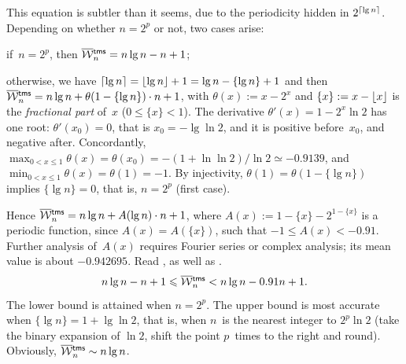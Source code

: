 This equation is subtler than it seems, due to the periodicity hidden
in \(2^{\lceil{\lg n}\rceil}\). Depending on whether \(n = 2^p\) or not,
two cases arise:
\begin{itemize*}

  \item if~\(n=2^p\), then \(\OW{\fun{tms}}{n} = n\lg n - n +
    1\);

  \item otherwise, we have \(\lceil{\lg n}\rceil = \lfloor{\lg n}\rfloor + 1 = \lg
    n - \{\lg n\} + 1\) and then \(\OW{\fun{tms}}{n} = n\lg n +
    \theta(1 - \{\lg n\}) \cdot n + 1\), with \(\theta(x) := x - 2^x\)
    and \(\{x\} := x - \lfloor{x}\rfloor\) is the \emph{fractional
    part} of~\(x\) (\(0 \leqslant \{x\} <
    1\)). The derivative \(\theta'(x) = 1 - 2^x\ln 2\) has one root:
    \(\theta'(x_0) = 0\), that is \(x_0 = -\lg\ln 2\), and it is
    positive before~\(x_0\), and negative after. Concordantly,
    \(\max_{0<x\leqslant 1}\theta(x) = \theta(x_0) =
    -(1+\ln\ln{2})/\!\ln{2} \simeq -0.9139\), and \(\min_{0<x\leqslant
      1}\theta(x) = \theta(1) = -1\). By injectivity, \(\theta(1) =
    \theta(1-\{\lg n\})\) implies \(\{\lg n\} = 0\), that is,
    \(n=2^p\) (first case).
\end{itemize*}
Hence \(\OW{\fun{tms}}{n} = n\lg n + A(\lg n) \cdot n + 1\), where
\(A(x) := 1 - \{x\} - 2^{1 - \{x\}}\) is a periodic function, since
\(A(x) = A(\{x\})\), such that \(-1 \leqslant A(x) < -0.91\). Further
analysis of~\(A(x)\) requires Fourier series or complex analysis; its
mean value is about \(-0.942695\). Read \cite{FlajoletGolin_1994}, as
well as \cite{PannyProdinger_1995}.
\begin{equation}
n\lg n - n + 1 \leqslant \OW{\fun{tms}}{n} <
n\lg n - 0.91 n + 1.\label{ineq:OWtms}
\end{equation}
The lower bound is attained when \(n=2^p\). The upper bound is most
accurate when \(\{\lg n\} = 1 + \lg\ln 2\), that is, when \(n\)~is the
nearest integer to \(2^p\ln 2\) (take the binary expansion of \(\ln
2\), shift the point \(p\)~times to the right and round). Obviously,
\(\OW{\fun{tms}}{n} \sim n\lg n\).



